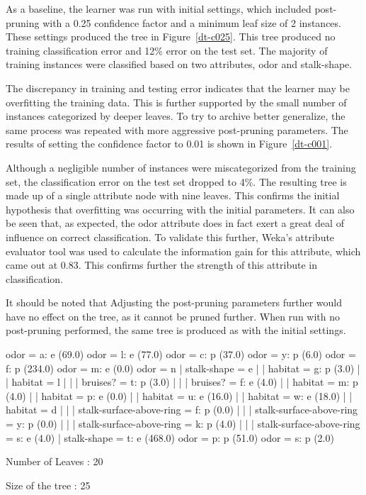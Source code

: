 \documentclass{sig-alternate}
\begin{document}
As a baseline, the learner was run with initial settings, which included post-pruning with a 0.25 confidence factor and a minimum leaf size of 2 instances. These settings produced the tree in Figure~\ref{dt-c025}. This tree produced no training classification error and 12\% error on the test set. The majority of training instances were classified based on two attributes, odor and stalk-shape.

The discrepancy in training and testing error indicates that the learner may be overfitting the training data. This is further supported by the small number of instances categorized by deeper leaves. To try to archive better generalize, the same process was repeated with more aggressive post-pruning parameters. The results of setting the confidence factor to 0.01 is shown in Figure~\ref{dt-c001}.

Although a negligible number of instances were miscategorized from the training set, the classification error on the test set dropped to 4\%. The resulting tree is made up of a single attribute node with nine leaves. This confirms the initial hypothesis that overfitting was occurring with the initial parameters. It can also be seen that, as expected, the odor attribute does in fact exert a great deal of influence on correct classification. To validate this further, Weka's attribute evaluator tool was used to calculate the information gain for this attribute, which came out at 0.83. This confirms further the strength of this attribute in classification.

It should be noted that Adjusting the post-pruning parameters further would have no effect on the tree, as it cannot be pruned further. When run with no post-pruning performed, the same tree is produced as with the initial settings.

\begin{verbbox}

odor = a: e (69.0)
odor = l: e (77.0)
odor = c: p (37.0)
odor = y: p (6.0)
odor = f: p (234.0)
odor = m: e (0.0)
odor = n
|   stalk-shape = e
|   |   habitat = g: p (3.0)
|   |   habitat = l
|   |   |   bruises? = t: p (3.0)
|   |   |   bruises? = f: e (4.0)
|   |   habitat = m: p (4.0)
|   |   habitat = p: e (0.0)
|   |   habitat = u: e (16.0)
|   |   habitat = w: e (18.0)
|   |   habitat = d
|   |   |   stalk-surface-above-ring = f: p (0.0)
|   |   |   stalk-surface-above-ring = y: p (0.0)
|   |   |   stalk-surface-above-ring = k: p (4.0)
|   |   |   stalk-surface-above-ring = s: e (4.0)
|   stalk-shape = t: e (468.0)
odor = p: p (51.0)
odor = s: p (2.0)

Number of Leaves  :     20

Size of the tree :  25

\end{verbbox}
\end{document}
